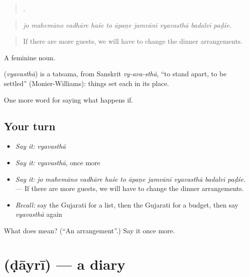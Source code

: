 \begin{quote}
         .
\end{quote}

\begin{quote}
\emph{jo mahemāno vadhāre haśe to āpaṇe jamvānī vyavasthā badalvī paḍśe.}
\end{quote}

\begin{quote}
If there are more guests, we will have to change the dinner arrangements.
\end{quote}

A feminine noun.

\begin{cousinweb}
\textbf{} (\emph{vyavasthā}) is a tatsama, from Sanskrit \emph{vy-ava-sthā}, \textquotedblleft{}to stand apart, to be settled\textquotedblright{} (Monier-Williams): things set each in its place.
\end{cousinweb}

\begin{grammarlens}[title={What you've built}]
One more word for saying what happens if.
\end{grammarlens}

\subsection*{Your turn}
\begin{itemize}
\raggedright
  \item \emph{Say it:} \emph{vyavasthā}
  \item \emph{Say it:} \emph{vyavasthā}, once more
  \item \emph{Say it:} \emph{jo mahemāno vadhāre haśe to āpaṇe jamvānī vyavasthā badalvī paḍśe.} — If there are more guests, we will have to change the dinner arrangements.
  \item \emph{Recall:} say the Gujarati for a list, then the Gujarati for a budget, then say \emph{vyavasthā} again
\end{itemize}

\begin{tcolorbox}[breakable,colback=teal!4,colframe=teal!35!black,title={Before you move on}]
What does  mean? (\textquotedblleft{}An arrangement\textquotedblright{}.) Say it once more.
\end{tcolorbox}
\section[\texorpdfstring{\gu{ડાયરી} (ḍāyrī)}{ડાયરી (ḍāyrī)}]{ (ḍāyrī) — a diary}

